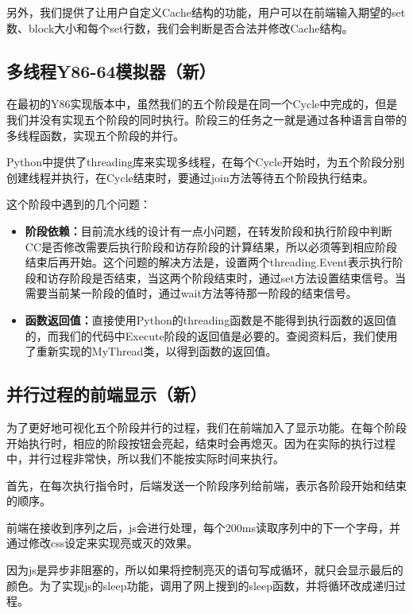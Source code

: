 \documentclass[a4paper,11pt,UTF8]{ctexart}
\begin{document}
\begin{sloppypar}
另外，我们提供了让用户自定义Cache结构的功能，用户可以在前端输入期望的set数、block大小和每个set行数，我们会判断是否合法并修改Cache结构。

\subsection{{\bf 多线程Y86-64模拟器（新）}}

在最初的Y86实现版本中，虽然我们的五个阶段是在同一个Cycle中完成的，但是我们并没有实现五个阶段的同时执行。阶段三的任务之一就是通过各种语言自带的多线程函数，实现五个阶段的并行。

Python中提供了threading库来实现多线程，在每个Cycle开始时，为五个阶段分别创建线程并执行，在Cycle结束时，要通过join方法等待五个阶段执行结束。

这个阶段中遇到的几个问题：

\begin{itemize}
\item {\bf 阶段依赖：}目前流水线的设计有一点小问题，在转发阶段和执行阶段中判断CC是否修改需要后执行阶段和访存阶段的计算结果，所以必须等到相应阶段结束后再开始。这个问题的解决方法是，设置两个threading.Event表示执行阶段和访存阶段是否结束，当这两个阶段结束时，通过set方法设置结束信号。当需要当前某一阶段的值时，通过wait方法等待那一阶段的结束信号。
\item {\bf 函数返回值：}直接使用Python的threading函数是不能得到执行函数的返回值的，而我们的代码中Execute阶段的返回值是必要的。查阅资料后，我们使用了重新实现的MyThread类，以得到函数的返回值。
\end{itemize}

\subsection{{\bf 并行过程的前端显示（新）}}

为了更好地可视化五个阶段并行的过程，我们在前端加入了显示功能。在每个阶段开始执行时，相应的阶段按钮会亮起，结束时会再熄灭。因为在实际的执行过程中，并行过程非常快，所以我们不能按实际时间来执行。

首先，在每次执行指令时，后端发送一个阶段序列给前端，表示各阶段开始和结束的顺序。

前端在接收到序列之后，js会进行处理，每个200ms读取序列中的下一个字母，并通过修改css设定来实现亮或灭的效果。

因为js是异步非阻塞的，所以如果将控制亮灭的语句写成循环，就只会显示最后的颜色。为了实现js的sleep功能，调用了网上搜到的sleep函数，并将循环改成递归过程。

\clearpage

\end{sloppypar}
\end{document}
